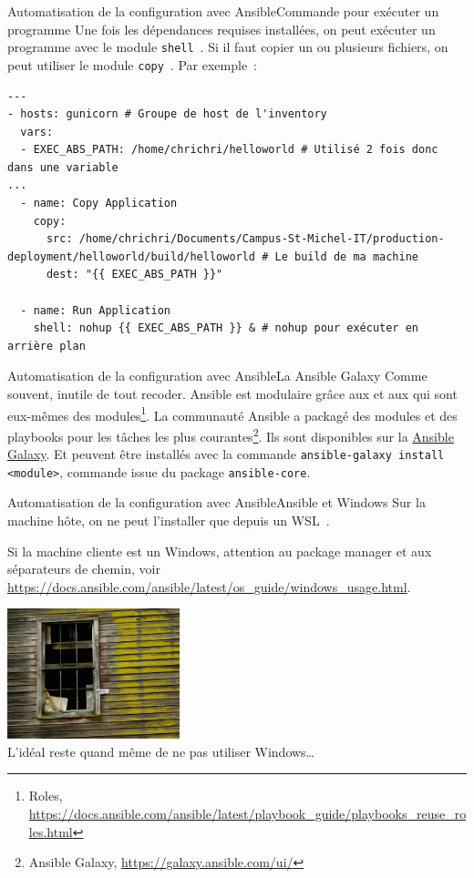\documentclass{beamer}
\begin{document}
    \begin{frame}[fragile]{Automatisation de la configuration avec Ansible}{Commande pour exécuter un programme}
        Une fois les dépendances requises installées, on peut exécuter un programme avec le module \lstinline{shell}~.
        \bigbreak
        Si il faut copier un ou plusieurs fichiers, on peut utiliser le module \lstinline{copy}~.
        \bigbreak
        Par exemple~:
        \begin{lstlisting}
---
- hosts: gunicorn # Groupe de host de l'inventory
  vars:
  - EXEC_ABS_PATH: /home/chrichri/helloworld # Utilisé 2 fois donc dans une variable
...
  - name: Copy Application
    copy:
      src: /home/chrichri/Documents/Campus-St-Michel-IT/production-deployment/helloworld/build/helloworld # Le build de ma machine
      dest: "{{ EXEC_ABS_PATH }}"

  - name: Run Application
    shell: nohup {{ EXEC_ABS_PATH }} & # nohup pour exécuter en arrière plan
        \end{lstlisting}
    \end{frame}

    \begin{frame}{Automatisation de la configuration avec Ansible}{La Ansible Galaxy}
        Comme souvent, inutile de tout recoder.
        Ansible est modulaire grâce aux  et aux  qui sont eux-mêmes des modules\footnote{Roles, \url{https://docs.ansible.com/ansible/latest/playbook_guide/playbooks_reuse_roles.html}}.
        \bigbreak
        La communauté Ansible a packagé des modules et des playbooks pour les tâches les plus courantes\footnote{Ansible Galaxy, \url{https://galaxy.ansible.com/ui/}}.
        Ils sont disponibles sur la \href{https://galaxy.ansible.com/}{Ansible Galaxy}.
        Et peuvent être installés avec la commande \lstinline{ansible-galaxy install <module>}, commande issue du package \lstinline{ansible-core}.
    \end{frame}

    \begin{frame}{Automatisation de la configuration avec Ansible}{Ansible et Windows}
        Sur la machine hôte, on ne peut l'installer que depuis un WSL~.
        \begin{dangercolorbox}
            Si la machine cliente est un Windows, attention au package manager et aux séparateurs de chemin, voir \url{https://docs.ansible.com/ansible/latest/os_guide/windows_usage.html}.
        \end{dangercolorbox}
        \bigbreak
        \centering
        \includegraphics[width=5cm]{image/broken-windows} \\ L'idéal reste quand même de ne pas utiliser Windows\ldots \\
    \end{frame}
\end{document}
